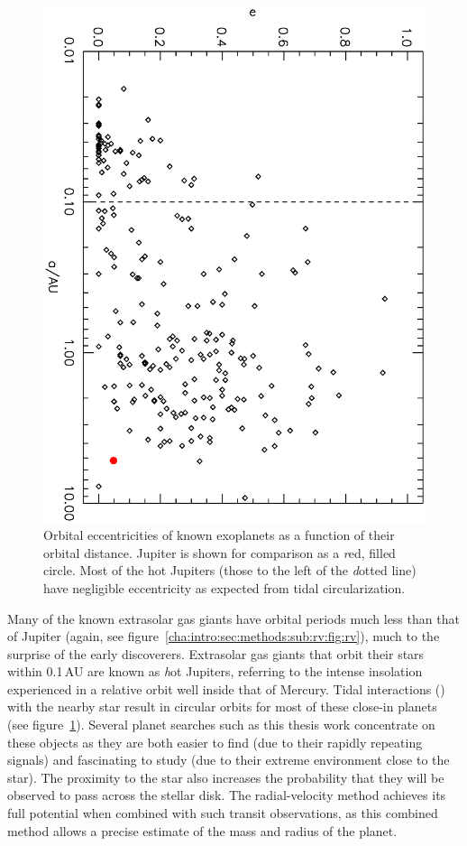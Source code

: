 \begin{figure}
\begin{center}
\centering
\includegraphics[angle=90,width=.90\textwidth]{1_rvplanetseccs}
\caption[Orbital eccentricity distribution of known exoplanets]{%
Orbital eccentricities of known exoplanets as a function of their orbital distance.
Jupiter is shown for comparison as a {\textit red, filled circle}.
Most of the hot Jupiters (those to the left of the {\textit dotted line}) have negligible eccentricity as expected from tidal circularization.%
}\label{cha:intro:sec:methods:sub:rv:fig:rve}
\end{center}
\end{figure}

Many of the known extrasolar gas giants have orbital periods much less than that of Jupiter (again, see figure~\ref{cha:intro:sec:methods:sub:rv:fig:rv}), much to the surprise of the early discoverers.
Extrasolar gas giants that orbit their stars within 0.1\,AU are known as {\textit hot Jupiters}, referring to the intense insolation experienced in a relative orbit well inside that of Mercury.
Tidal interactions (\citealp[see, e.g.,][]{Rasio_Ford:Science:1996a}) with the nearby star result in circular orbits for most of these close-in planets (see figure~\ref{cha:intro:sec:methods:sub:rv:fig:rve}).%
Several planet searches such as this thesis work concentrate on these objects as they are both easier to find (due to their rapidly repeating signals) and fascinating to study (due to their extreme environment close to the star).
The proximity to the star also increases the probability that they will be observed to pass across the stellar disk.
The radial-velocity method achieves its full potential when combined with such transit observations, as this combined method allows a precise estimate of the mass and radius of the planet.

